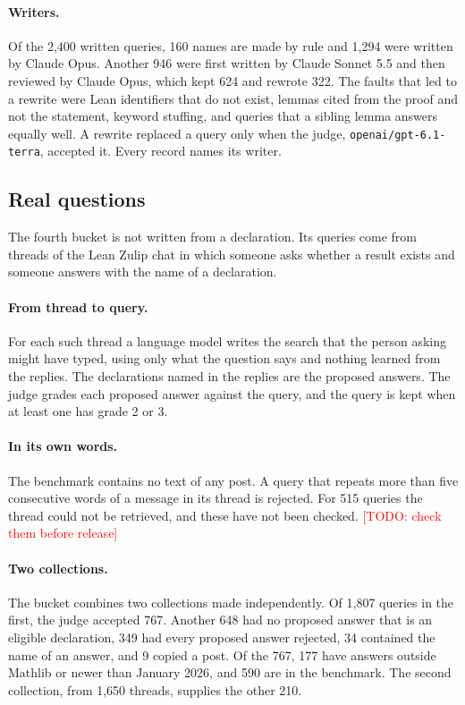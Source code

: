 \documentclass{article}
\newcommand{\code}[1]{\texttt{\small #1}}
\newcommand{\todo}[1]{\textcolor{red}{[TODO: #1]}}
\begin{document}
\paragraph{Writers.} Of the 2,400 written queries, 160 names are made by rule
and 1,294 were written by Claude Opus. Another 946 were first written by
Claude Sonnet 5.5 and then reviewed by Claude Opus, which kept 624 and
rewrote 322. The faults that led to a rewrite were Lean identifiers that do
not exist, lemmas cited from the proof and not the statement, keyword
stuffing, and queries that a sibling lemma answers equally well. A rewrite
replaced a query only when the judge, \code{openai/gpt-6.1-terra}, accepted
it. Every record names its writer.

\subsection{Real questions}

The fourth bucket is not written from a declaration. Its queries come from
threads of the Lean Zulip chat in which someone asks whether a result exists
and someone answers with the name of a declaration.

\paragraph{From thread to query.} For each such thread a language model
writes the search that the person asking might have typed, using only what the
question says and nothing learned from the replies. The declarations named in the replies are
the proposed answers. The judge grades each proposed answer against the query,
and the query is kept when at least one has grade 2 or 3.

\paragraph{In its own words.} The benchmark contains no text of any post. A
query that repeats more than five consecutive words of a message in its
thread is rejected. For 515 queries the thread could not be retrieved, and
these have not been checked. \todo{check them before release}

\paragraph{Two collections.} The bucket combines two collections made
independently. Of 1,807 queries in the first, the judge accepted 767. Another
648 had no proposed answer that is an eligible declaration, 349 had every
proposed answer rejected, 34 contained the name of an answer, and 9 copied a
post. Of the 767, 177 have answers outside Mathlib or newer than January
2026, and 590 are in the benchmark. The second collection, from 1,650 threads,
supplies the other 210.
\end{document}
